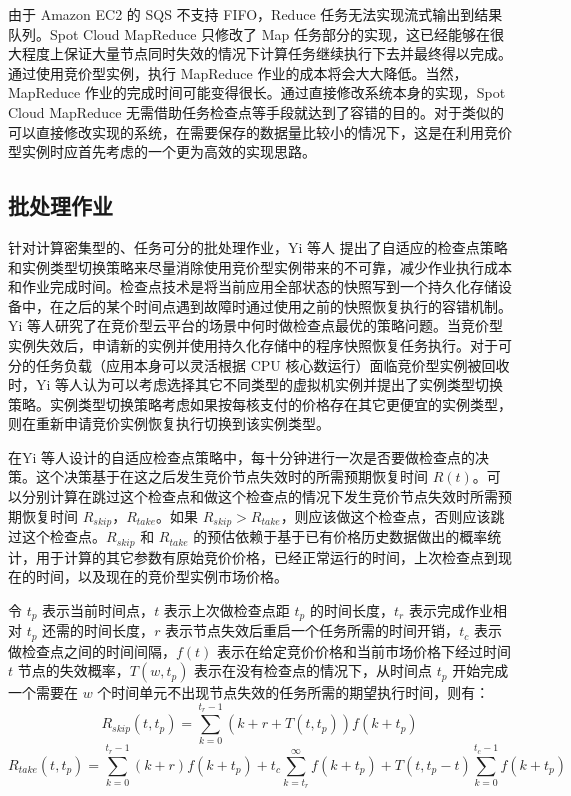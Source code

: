 由于 Amazon EC2 的 SQS 不支持 FIFO，Reduce 任务无法实现流式输出到结果队列。Spot Cloud MapReduce 只修改了 Map 任务部分的实现，这已经能够在很大程度上保证大量节点同时失效的情况下计算任务继续执行下去并最终得以完成。通过使用竞价型实例，执行 MapReduce 作业的成本将会大大降低。当然，MapReduce 作业的完成时间可能变得很长。通过直接修改系统本身的实现，Spot Cloud MapReduce 无需借助任务检查点等手段就达到了容错的目的。对于类似的可以直接修改实现的系统，在需要保存的数据量比较小的情况下，这是在利用竞价型实例时应首先考虑的一个更为高效的实现思路。

\subsection{批处理作业}
针对计算密集型的、任务可分的批处理作业，Yi 等人 \cite{Yi:2010:RCS:1844768.1845343, 5975137} 提出了自适应的检查点策略和实例类型切换策略来尽量消除使用竞价型实例带来的不可靠，减少作业执行成本和作业完成时间。检查点技术是将当前应用全部状态的快照写到一个持久化存储设备中，在之后的某个时间点遇到故障时通过使用之前的快照恢复执行的容错机制。Yi 等人研究了在竞价型云平台的场景中何时做检查点最优的策略问题。当竞价型实例失效后，申请新的实例并使用持久化存储中的程序快照恢复任务执行。对于可分的任务负载（应用本身可以灵活根据 CPU 核心数运行）面临竞价型实例被回收时，Yi 等人认为可以考虑选择其它不同类型的虚拟机实例并提出了实例类型切换策略。实例类型切换策略考虑如果按每核支付的价格存在其它更便宜的实例类型，则在重新申请竞价实例恢复执行切换到该实例类型。

在Yi 等人设计的自适应检查点策略中，每十分钟进行一次是否要做检查点的决策。这个决策基于在这之后发生竞价节点失效时的所需预期恢复时间 $R(t)$。可以分别计算在跳过这个检查点和做这个检查点的情况下发生竞价节点失效时所需预期恢复时间 $R_{skip}$，$R_{take}$。如果 $R_{skip} > R_{take}$，则应该做这个检查点，否则应该跳过这个检查点。$R_{skip}$ 和 $R_{take}$ 的预估依赖于基于已有价格历史数据做出的概率统计，用于计算的其它参数有原始竞价价格，已经正常运行的时间，上次检查点到现在的时间，以及现在的竞价型实例市场价格。

令 $t_p$ 表示当前时间点，$t$ 表示上次做检查点距 $t_p$ 的时间长度，$t_r$ 表示完成作业相对 $t_p$ 还需的时间长度，$r$ 表示节点失效后重启一个任务所需的时间开销，$t_c$ 表示做检查点之间的时间间隔，$f(t)$ 表示在给定竞价价格和当前市场价格下经过时间 $t$ 节点的失效概率，$T(w, t_p)$ 表示在没有检查点的情况下，从时间点 $t_p$ 开始完成一个需要在 $w$ 个时间单元不出现节点失效的任务所需的期望执行时间，则有：
\begin{equation}\label{eq_rskip}\nonumber 
R_{skip}(t, t_p) = \sum_{k=0}^{t_r - 1}(k + r + T(t,t_p))f(k+t_p)
\end{equation}
\begin{equation}\label{eq_rtake}\nonumber 
R_{take}(t, t_p) = \sum_{k=0}^{t_r - 1}(k + r)f(k+t_p) + t_c\sum_{k=t_r}^{\infty}f(k+t_p)+T(t,t_p-t)\sum_{k=0}^{t_c - 1}f(k+t_p)
\end{equation}

